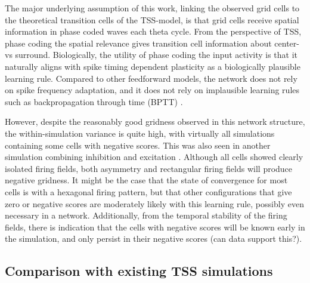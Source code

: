 \documentclass{article}
\begin{document}
    The major underlying assumption of this work, linking the observed grid cells to the theoretical transition cells of the TSS-model, is that grid cells receive spatial information in phase coded waves each theta cycle. From the perspective of TSS, phase coding the spatial relevance gives transition cell information about center- vs surround. Biologically, the utility of phase coding the input activity is that it naturally aligns with spike timing dependent plasticity as a biologically plausible learning rule.  Compared to other feedforward models, the network does not rely on spike frequency adaptation, and it does not rely on implausible learning rules such as backpropagation through time (BPTT) \parencite{Kropff2008}.

    However, despite the reasonably good gridness observed in this network structure, the within-simulation variance is quite high, with virtually all simulations containing some cells with negative scores. This was also seen in another simulation combining inhibition and excitation \parencite{Weber2018}. Although all cells showed clearly isolated firing fields, both asymmetry and rectangular firing fields will produce negative gridness. It might be the case that the state of convergence for most cells is with a hexagonal firing pattern, but that other configurations that give zero or negative scores are moderately likely with this learning rule, possibly even necessary in a network. Additionally, from the temporal stability of the firing fields, there is indication that the cells with negative scores will be known early in the simulation, and only persist in their negative scores (can data support this?).


    \subsection{Comparison with existing TSS simulations} \label{TSS model comparison}
\end{document}
